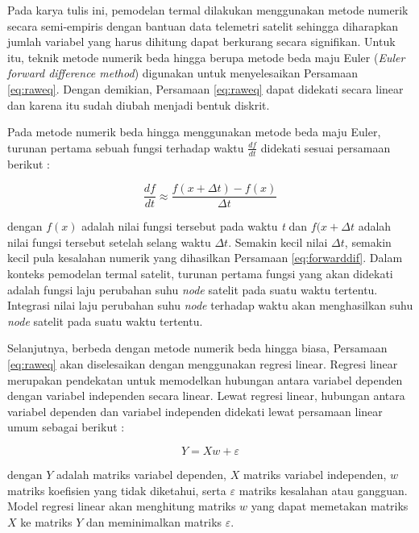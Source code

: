 Pada karya tulis ini, pemodelan termal dilakukan menggunakan metode numerik
secara semi-empiris dengan bantuan data telemetri satelit sehingga diharapkan
jumlah variabel yang harus dihitung dapat berkurang secara signifikan. Untuk
itu, teknik metode numerik beda hingga berupa metode beda maju Euler (\textit{Euler forward difference method}) digunakan untuk menyelesaikan Persamaan
\ref{eq:raweq}. Dengan demikian, Persamaan \ref{eq:raweq} dapat didekati secara
linear dan karena itu sudah diubah menjadi bentuk diskrit.

Pada metode numerik beda hingga menggunakan metode beda maju Euler, turunan
pertama sebuah fungsi terhadap waktu $\frac{df}{dt}$ didekati sesuai persamaan
berikut \cite{morton2005}:

\begin{equation}
\label{eq:forwarddif}
	\frac{df}{dt} \approx	\frac{f(x + \Delta t) - f(x)}{\Delta t} 
\end{equation}

dengan $f(x)$ adalah nilai fungsi tersebut pada waktu \textit{t} dan $f(x +
\Delta t$ adalah nilai fungsi tersebut setelah selang waktu $\Delta t$. Semakin
kecil nilai $\Delta t$, semakin kecil pula kesalahan numerik yang dihasilkan Persamaan
\ref{eq:forwarddif}. Dalam konteks pemodelan termal satelit, turunan pertama fungsi yang akan didekati adalah fungsi laju perubahan suhu \textit{node} satelit pada suatu waktu tertentu. Integrasi nilai laju perubahan suhu \textit{node} terhadap waktu akan menghasilkan suhu \textit{node} satelit pada suatu waktu tertentu.

Selanjutnya, berbeda dengan metode numerik beda hingga biasa, Persamaan
\ref{eq:raweq} akan diselesaikan dengan menggunakan regresi linear. Regresi
linear merupakan pendekatan untuk memodelkan hubungan antara variabel dependen
dengan variabel independen secara linear. Lewat regresi linear, hubungan antara
variabel dependen dan variabel independen didekati lewat persamaan linear umum
sebagai berikut \cite{freedman2009}:

\begin{equation}
\label{eq:reglinear}
Y = Xw + \varepsilon
\end{equation}

dengan $Y$ adalah matriks variabel dependen, $X$ matriks variabel independen,
$w$ matriks koefisien yang tidak diketahui, serta $\varepsilon$ matriks
kesalahan atau gangguan. Model regresi linear akan menghitung matriks $w$ yang dapat memetakan matriks $X$ ke matriks $Y$ dan meminimalkan matriks $\varepsilon$.

